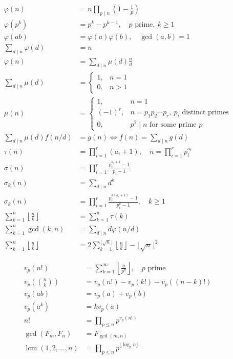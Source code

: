 \begin{align*}
\varphi(n)
&= n\prod_{p\mid n}\left(1-\frac1p\right)\\
\varphi(p^k)
&= p^k-p^{k-1},\quad p\text{ prime},\ k\ge1\\
\varphi(ab)
&= \varphi(a)\varphi(b),\quad\gcd(a,b)=1\\
\sum_{d\mid n}\varphi(d)
&= n\\
\varphi(n)
&= \sum_{d\mid n}\mu(d)\frac nd\\
\sum_{d\mid n}\mu(d)
&= \begin{cases}1,&n=1\\0,&n>1\end{cases}\\
\mu(n)
&= \begin{cases}
1,&n=1\\
(-1)^r,&n=p_1p_2\cdots p_r,\ p_i\text{ distinct primes}\\
0,&p^2\mid n\text{ for some prime }p
\end{cases}\\
\sum_{d\mid n}\mu(d)f(n/d)
&= g(n)
\iff
f(n)=\sum_{d\mid n}g(d)\\
\tau(n)
&= \prod_{i=1}^{r}(a_i+1),
\quad n=\prod_{i=1}^{r}p_i^{a_i}\\
\sigma(n)
&= \prod_{i=1}^{r}
\frac{p_i^{a_i+1}-1}{p_i-1}\\
\sigma_k(n)
&= \sum_{d\mid n}d^k\\
\sigma_k(n)
&= \prod_{i=1}^{r}
\frac{p_i^{k(a_i+1)}-1}{p_i^k-1},
\quad k\ge1\\
\sum_{k=1}^{n}\left\lfloor\frac nk\right\rfloor
&= \sum_{k=1}^{n}\tau(k)\\
\sum_{k=1}^{n}\gcd(k,n)
&= \sum_{d\mid n}d\varphi(n/d)\\
\sum_{k=1}^{n}\left\lfloor\frac nk\right\rfloor
&= 2\sum_{k=1}^{\lfloor\sqrt n\rfloor}
\left\lfloor\frac nk\right\rfloor
-\lfloor\sqrt n\rfloor^2
\end{align*}

\begin{align*}
v_p(n!)
&= \sum_{k=1}^{\infty}\left\lfloor\frac{n}{p^k}\right\rfloor,
\quad p\text{ prime}\\
v_p\left(\binom nk\right)
&= v_p(n!)-v_p(k!)-v_p((n-k)!)\\
v_p(ab)&=v_p(a)+v_p(b)\\
v_p(a^k)&=kv_p(a)\\
n!
&= \prod_{p\le n}p^{v_p(n!)}\\
\gcd(F_m,F_n)&=F_{\gcd(m,n)}\\
\operatorname{lcm}(1,2,\ldots,n)
&= \prod_{p\le n}p^{\lfloor\log_p n\rfloor}
\end{align*}

